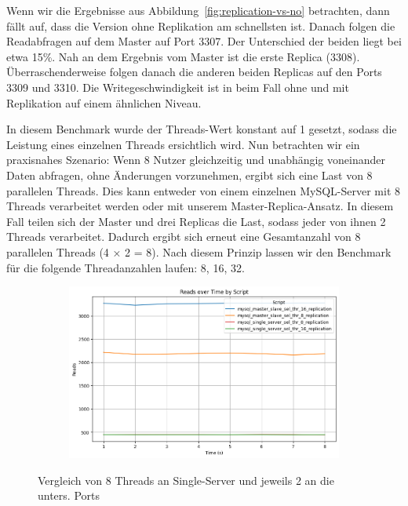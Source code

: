 Wenn wir die Ergebnisse aus Abbildung~\ref{fig:replication-vs-no} betrachten, dann fällt auf, dass die Version ohne Replikation am schnellsten ist.
Danach folgen die Readabfragen auf dem Master auf Port 3307.
Der Unterschied der beiden liegt bei etwa 15\%.
Nah an dem Ergebnis vom Master ist die erste Replica (3308).
Überraschenderweise folgen danach die anderen beiden Replicas auf den Ports 3309 und 3310.
Die Writegeschwindigkeit ist in beim Fall ohne und mit Replikation auf einem ähnlichen Niveau.

In diesem Benchmark wurde der Threads-Wert konstant auf 1 gesetzt, sodass die Leistung eines einzelnen Threads ersichtlich wird.
Nun betrachten wir ein praxisnahes Szenario: Wenn 8 Nutzer gleichzeitig und unabhängig voneinander Daten abfragen, ohne Änderungen vorzunehmen, ergibt sich eine Last von 8 parallelen Threads.
Dies kann entweder von einem einzelnen MySQL-Server mit 8 Threads verarbeitet werden oder mit unserem Master-Replica-Ansatz.
In diesem Fall teilen sich der Master und drei Replicas die Last, sodass jeder von ihnen 2 Threads verarbeitet.
Dadurch ergibt sich erneut eine Gesamtanzahl von 8 parallelen Threads (4 × 2 = 8).
Nach diesem Prinzip lassen wir den Benchmark für die folgende Threadanzahlen laufen: 8, 16, 32.

\vspace{-8pt}
\begin{figure}[H]
  \centering
  \begin{subfigure}[t]{0.48\textwidth}
    \includegraphics[width=\textwidth]{PNGs/Script/Replication/replication-multiple-select-threads/Reads}
    \label{replication-multiple-select-threads-reads}
  \end{subfigure}
  \vspace{-20pt}
  \caption[Replikation: Threadanzahl aufgeteilt an Master-Replica]{Vergleich von 8 Threads an Single-Server und jeweils 2 an die unters. Ports }
  \label{fig:replication-multiple-select-threads}
\end{figure}
\vspace{-20pt}

